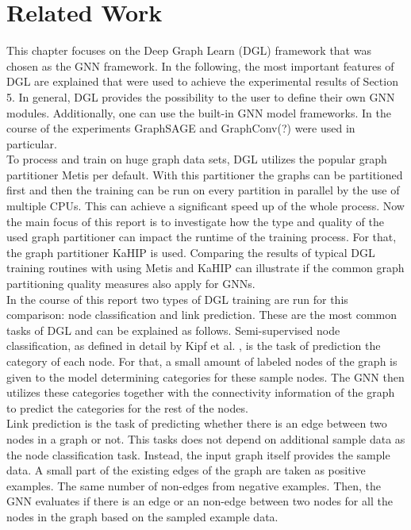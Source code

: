 \documentclass[acmsmall,nonacm,screen,review]{acmart}
\begin{document}
\section{Related Work}
This chapter focuses on the Deep Graph Learn (DGL) framework \cite{DGL} that was chosen as the GNN framework. In the following, the most important features of DGL are explained that were used to achieve the experimental results of Section 5. In general, DGL provides the possibility to the user to define their own GNN modules. Additionally, one can use the built-in GNN model frameworks. In the course of the experiments GraphSAGE \cite{GraphSAGE} and GraphConv(?) \cite{NC} were used in particular. \\
To process and train on huge graph data sets, DGL utilizes the popular graph partitioner Metis \cite{Metis} per default. With this partitioner the graphs can be partitioned first and then the training can be run on every partition in parallel by the use of multiple CPUs. This can achieve a significant speed up of the whole process. Now the main focus of this report is to investigate how the type and quality of the used graph partitioner can impact the runtime of the training process. For that, the graph partitioner KaHIP \cite{KaHIP} is used. Comparing the results of typical DGL training routines with using Metis and KaHIP can illustrate if the common graph partitioning quality measures also apply for GNNs. \\
In the course of this report two types of DGL training are run for this comparison: node classification and link prediction. These are the most common tasks of DGL and can be explained as follows. Semi-supervised node classification, as defined in detail by Kipf et al. \cite{NC}, is the task of prediction the category of each node. For that, a small amount of labeled nodes of the graph is given to the model determining categories for these sample nodes. The GNN then utilizes these categories together with the connectivity information of the graph to predict the categories for the rest of the nodes. \\%
Link prediction is the task of predicting whether there is an edge between two nodes in a graph or not. This tasks does not depend on additional sample data as the node classification task. Instead, the input graph itself provides the sample data. A small part of the existing edges of the graph are taken as positive examples. The same number of non-edges from negative examples. Then, the GNN evaluates if there is an edge or an non-edge between two nodes for all the nodes in the graph based on the sampled example data.
\end{document}
